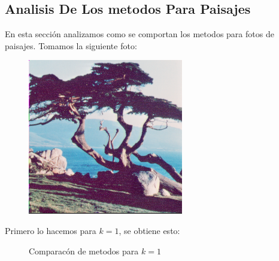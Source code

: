 \subsection{Analisis De Los metodos Para Paisajes}

En esta sección analizamos como se comportan los metodos para fotos de paisajes. Tomamos la siguiente foto:

\begin{figure}[H]
\centering
\includegraphics[scale=0.50]{fotos/paisaje/orig.png}
\end{figure}

Primero lo hacemos para $k=1$, se obtiene esto:

\begin{figure}[H]
    \centering
    \qquad
    \qquad
    \caption{Comparacón de metodos para $k = 1$}%
    \label{fig:example}%
\end{figure}

